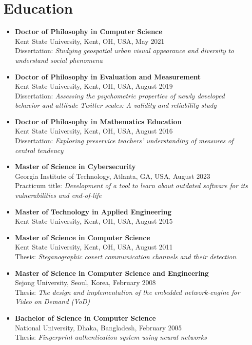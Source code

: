 \documentclass{article}
\begin{document}
\section*{Education}\vspace{-0.5em}
% 
 \begin{itemize}\setlength{\itemindent}{-.25in} 
  \setlength\itemsep{-0.4em}
      \item[]
      \textbf{Doctor of Philosophy in Computer Science} \\
      Kent State University, Kent, OH, USA, May 2021 \\
      Dissertation: {\em Studying geospatial urban visual appearance and diversity to understand social phenomena} 
     \item[]
      \textbf{Doctor of Philosophy in Evaluation and Measurement} \\
      Kent State University, Kent, OH, USA, August 2019 \\
      Dissertation: {\em Assessing the psychometric properties of newly developed behavior and attitude Twitter scales: A validity and reliability study} 
   \item[]
      \textbf{Doctor of Philosophy in Mathematics Education} \\
      Kent State University, Kent, OH, USA, August 2016 \\
      Dissertation: {\em Exploring preservice teachers' understanding of measures of central tendency}
   \item[]
      \textbf{Master of Science in Cybersecurity} \\
      Georgia Institute of Technology, Atlanta, GA, USA, August 2023\\
      Practicum title: {\em Development of a tool to learn about outdated software for its vulnerabilities and end-of-life}
  \item[]
      \textbf{Master of Technology in Applied Engineering} \\
      Kent State University, Kent, OH, USA, August 2015 
  \item[]
      \textbf{Master of Science in Computer Science} \\
      Kent State University, Kent, OH, USA, August 2011 \\
      Thesis: {\em Steganographic covert communication channels and their detection} 
 \item[]
      \textbf{Master of Science in Computer Science and Engineering} \\
      Sejong University, Seoul, Korea,  February 2008 \\
      Thesis: {\em The design and implementation of the embedded network-engine for Video on Demand (VoD)} 
  \item[]
      \textbf{Bachelor of Science in Computer Science} \\
      National University, Dhaka, Bangladesh, February 2005 \\
      Thesis: {\em Fingerprint authentication system using neural networks}
  \end{itemize}
\end{document}
